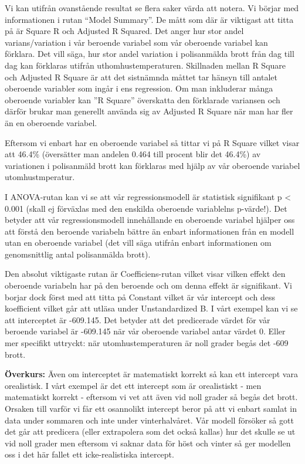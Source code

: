 \documentclass[
]{book}
\begin{document}
Vi kan utifrån ovanstående resultat se flera saker värda att notera. Vi börjar med informationen i rutan ``Model Summary''. De mått som där är viktigast att titta på är Square R och Adjusted R Squared. Det anger hur stor andel varians/variation i vår beroende variabel som vår oberoende variabel kan förklara. Det vill säga, hur stor andel variation i polisanmälda brott från dag till dag kan förklaras utifrån uthomhustemperaturen. Skillnaden mellan R Square och Adjusted R Square är att det sistnämnda måttet tar hänsyn till antalet oberoende variabler som ingår i ens regression. Om man inkluderar många oberoende variabler kan ''R Square'' överskatta den förklarade variansen och därför brukar man generellt använda sig av Adjusted R Square när man har fler än en oberoende variabel.

Eftersom vi enbart har en oberoende variabel så tittar vi på R Square vilket visar att 46.4\% (översätter man andelen 0.464 till procent blir det 46.4\%) av variationen i polisanmäld brott kan förklaras med hjälp av vår oberoende variabel utomhustmperatur.

I ANOVA-rutan kan vi se att vår regressionsmodell är statistisk signifikant p \textless{} 0.001 (skall ej förväxlas med den enskilda oberoende variablelns p-värde!). Det betyder att vår regressionsmodell innehållande en oberoende variabel hjälper oss att förstå den beroende variabeln bättre än enbart informationen från en modell utan en oberoende variabel (det vill säga utifrån enbart informationen om genomsnittlig antal polisanmälda brott).

Den absolut viktigaste rutan är Coefficiens-rutan vilket visar vilken effekt den oberoende variabeln har på den beroende och om denna effekt är signifikant. Vi borjar dock först med att titta på Constant vilket är vår intercept och dess koefficient vilket går att utläsa under Unstandardized B. I vårt exempel kan vi se att interceptet är -609.145. Det betyder att det predicerade värdet för vår beroende variabel är -609.145 när vår oberoende variabel antar värdet 0. Eller mer specifikt uttryckt: när utomhustemperaturen är noll grader begås det -609 brott.

\textbf{Överkurs:}
Även om interceptet är matematiskt korrekt så kan ett intercept vara orealistisk. I vårt exempel är det ett intercept som är orealistiskt - men matematiskt korrekt - eftersom vi vet att även vid noll grader så begås det brott. Orsaken till varför vi får ett osannolikt intercept beror på att vi enbart samlat in data under sommaren och inte under vinterhalvåret. Vår modell försöker så gott det går att predicera (eller extrapolera som det också kallas) hur det skulle se ut vid noll grader men eftersom vi saknar data för höst och vinter så ger modellen oss i det här fallet ett icke-realistiska intercept.
\end{document}
